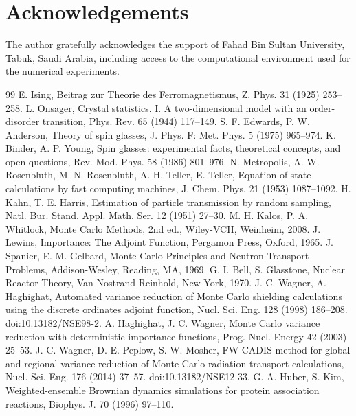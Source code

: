 \documentclass[a4paper,fleqn]{cas-sc}
\begin{document}
\section*{Acknowledgements}
The author gratefully acknowledges the support of Fahad Bin Sultan University, Tabuk, Saudi Arabia, including access to the computational environment used for the numerical experiments.


\printcredits

\begin{thebibliography}{99}
 E. Ising, Beitrag zur Theorie des Ferromagnetismus, Z. Phys. 31 (1925) 253--258.
 L. Onsager, Crystal statistics. I. A two-dimensional model with an order-disorder transition, Phys. Rev. 65 (1944) 117--149.
 S. F. Edwards, P. W. Anderson, Theory of spin glasses, J. Phys. F: Met. Phys. 5 (1975) 965--974.
 K. Binder, A. P. Young, Spin glasses: experimental facts, theoretical concepts, and open questions, Rev. Mod. Phys. 58 (1986) 801--976.
 N. Metropolis, A. W. Rosenbluth, M. N. Rosenbluth, A. H. Teller, E. Teller, Equation of state calculations by fast computing machines, J. Chem. Phys. 21 (1953) 1087--1092.
 H. Kahn, T. E. Harris, Estimation of particle transmission by random sampling, Natl. Bur. Stand. Appl. Math. Ser. 12 (1951) 27--30.
 M. H. Kalos, P. A. Whitlock, Monte Carlo Methods, 2nd ed., Wiley-VCH, Weinheim, 2008.
 J. Lewins, Importance: The Adjoint Function, Pergamon Press, Oxford, 1965.
 J. Spanier, E. M. Gelbard, Monte Carlo Principles and Neutron Transport Problems, Addison-Wesley, Reading, MA, 1969.
 G. I. Bell, S. Glasstone, Nuclear Reactor Theory, Van Nostrand Reinhold, New York, 1970.
 J. C. Wagner, A. Haghighat, Automated variance reduction of Monte Carlo shielding calculations using the discrete ordinates adjoint function, Nucl. Sci. Eng. 128 (1998) 186--208. doi:10.13182/NSE98-2.
 A. Haghighat, J. C. Wagner, Monte Carlo variance reduction with deterministic importance functions, Prog. Nucl. Energy 42 (2003) 25--53.
 J. C. Wagner, D. E. Peplow, S. W. Mosher, FW-CADIS method for global and regional variance reduction of Monte Carlo radiation transport calculations, Nucl. Sci. Eng. 176 (2014) 37--57. doi:10.13182/NSE12-33.
 G. A. Huber, S. Kim, Weighted-ensemble Brownian dynamics simulations for protein association reactions, Biophys. J. 70 (1996) 97--110.

\end{thebibliography}
\end{document}
